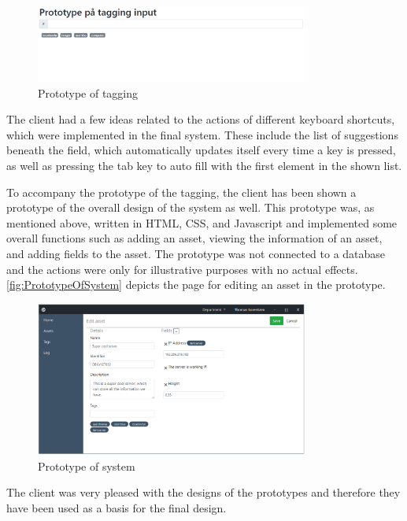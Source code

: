 \begin{figure}[H]
    \centering
    \includegraphics[width=0.8\textwidth]{figures/Prototypes/PrototypeOfTagging.png}
    \caption{Prototype of tagging}
    \label{fig:PrototypeOfTagging}
\end{figure}

The client had a few ideas related to the actions of different keyboard shortcuts, which were implemented in the final system. These include the list of suggestions beneath the field, which automatically updates itself every time a key is pressed, as well as pressing the tab key to auto fill with the first element in the shown list.
\par
To accompany the prototype of the tagging, the client has been shown a prototype of the overall design of the system as well. This prototype was, as mentioned above, written in HTML, CSS, and Javascript and implemented some overall functions such as adding an asset, viewing the information of an asset, and adding fields to the asset. The prototype was not connected to a database and the actions were only for illustrative purposes with no actual effects. \autoref{fig:PrototypeOfSystem} depicts the page for editing an asset in the prototype.

\begin{figure}[H]
    \centering
    \includegraphics[width=0.8\textwidth]{figures/Prototypes/AssetEditor_Prototype.png}
    \caption{Prototype of system}
    \label{fig:PrototypeOfSystem}
\end{figure}

The client was very pleased with the designs of the prototypes and therefore they have been used as a basis for the final design.

